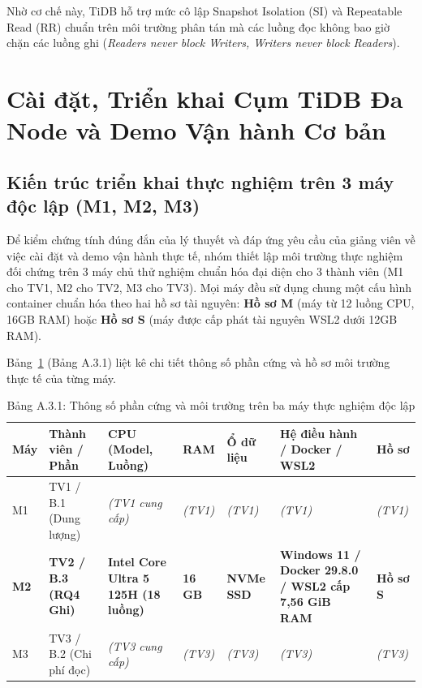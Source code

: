 Nhờ cơ chế này, TiDB hỗ trợ mức cô lập Snapshot Isolation (SI) và Repeatable Read (RR) chuẩn trên môi trường phân tán mà các luồng đọc không bao giờ chặn các luồng ghi (\textit{Readers never block Writers, Writers never block Readers}).

\section{Cài đặt, Triển khai Cụm TiDB Đa Node và Demo Vận hành Cơ bản}
\label{sec:phan_a_cai_dat_trien_khai}

\subsection{Kiến trúc triển khai thực nghiệm trên 3 máy độc lập (M1, M2, M3)}

Để kiểm chứng tính đúng đắn của lý thuyết và đáp ứng yêu cầu của giảng viên về việc cài đặt và demo vận hành thực tế, nhóm thiết lập môi trường thực nghiệm đối chứng trên 3 máy chủ thử nghiệm chuẩn hóa đại diện cho 3 thành viên (M1 cho TV1, M2 cho TV2, M3 cho TV3). Mọi máy đều sử dụng chung một cấu hình container chuẩn hóa theo hai hồ sơ tài nguyên: \textbf{Hồ sơ M} (máy từ 12 luồng CPU, 16GB RAM) hoặc \textbf{Hồ sơ S} (máy được cấp phát tài nguyên WSL2 dưới 12GB RAM).

Bảng~\ref{tab:ba_may_thuc_nghiem} (Bảng A.3.1) liệt kê chi tiết thông số phần cứng và hồ sơ môi trường thực tế của từng máy.

\begin{table}[H]
\centering
\caption{Bảng A.3.1: Thông số phần cứng và môi trường trên ba máy thực nghiệm độc lập}
\label{tab:ba_may_thuc_nghiem}
\bangfont
\begin{tabularx}{\linewidth}{@{}>{\centering\arraybackslash}p{1.0cm}>{\raggedright\arraybackslash}p{2.3cm}>{\raggedright\arraybackslash}p{3.2cm}>{\centering\arraybackslash}p{1.3cm}>{\raggedright\arraybackslash}p{2.0cm}>{\raggedright\arraybackslash}p{3.5cm}>{\centering\arraybackslash}p{1.3cm}@{}}
\toprule
\textbf{Máy} & \textbf{Thành viên / Phần} & \textbf{CPU (Model, Luồng)} & \textbf{RAM} & \textbf{Ổ dữ liệu} & \textbf{Hệ điều hành / Docker / WSL2} & \textbf{Hồ sơ}\\
\midrule
M1 & TV1 / B.1 (Dung lượng) & \textit{(TV1 cung cấp)} & \textit{(TV1)} & \textit{(TV1)} & \textit{(TV1)} & \textit{(TV1)}\\
\midrule
\textbf{M2} & \textbf{TV2 / B.3 (RQ4 Ghi)} & \textbf{Intel Core Ultra 5 125H (18 luồng)} & \textbf{16 GB} & \textbf{NVMe SSD} & \textbf{Windows 11 / Docker 29.8.0 / WSL2 cấp 7,56 GiB RAM} & \textbf{Hồ sơ S}\\
\midrule
M3 & TV3 / B.2 (Chi phí đọc) & \textit{(TV3 cung cấp)} & \textit{(TV3)} & \textit{(TV3)} & \textit{(TV3)} & \textit{(TV3)}\\
\bottomrule
\end{tabularx}
\end{table}

